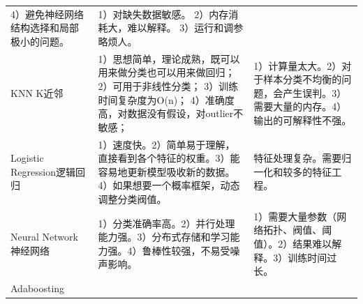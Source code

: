 \begin{longtable}[]{lll}
\begin{minipage}[t]{0.04\columnwidth}
  4）避免神经网络结构选择和局部极小的问题。
  \strut
\end{minipage}
&
\begin{minipage}[t]{0.04\columnwidth}
  \raggedright
  \strut
  1）对缺失数据敏感。
  2）内存消耗大，难以解释。
  3）运行和调参略烦人。
  \strut
\end{minipage}
\tabularnewline
\begin{minipage}[t]{0.04\columnwidth}\raggedright\strut
KNN K近邻\strut
\end{minipage} & \begin{minipage}[t]{0.04\columnwidth}\raggedright\strut
1）思想简单，理论成熟，既可以用来做分类也可以用来做回归；
2）可用于非线性分类； 3）训练时间复杂度为O(n)；
4）准确度高，对数据没有假设，对outlier不敏感；\strut
\end{minipage} & \begin{minipage}[t]{0.04\columnwidth}\raggedright\strut
1）计算量太大。2）对于样本分类不均衡的问题，会产生误判。3）需要大量的内存。4）输出的可解释性不强。\strut
\end{minipage}\tabularnewline
\begin{minipage}[t]{0.04\columnwidth}\raggedright\strut
Logistic Regression逻辑回归\strut
\end{minipage} & \begin{minipage}[t]{0.04\columnwidth}\raggedright\strut
1）速度快。2）简单易于理解，直接看到各个特征的权重。3）能容易地更新模型吸收新的数据。4）如果想要一个概率框架，动态调整分类阀值。\strut
\end{minipage} & \begin{minipage}[t]{0.04\columnwidth}\raggedright\strut
特征处理复杂。需要归一化和较多的特征工程。\strut
\end{minipage}\tabularnewline
\begin{minipage}[t]{0.04\columnwidth}\raggedright\strut
Neural Network 神经网络\strut
\end{minipage} & \begin{minipage}[t]{0.04\columnwidth}\raggedright\strut
1）分类准确率高。2）并行处理能力强。3）分布式存储和学习能力强。4）鲁棒性较强，不易受噪声影响。\strut
\end{minipage} & \begin{minipage}[t]{0.04\columnwidth}\raggedright\strut
1）需要大量参数（网络拓扑、阀值、阈值）。2）结果难以解释。3）训练时间过长。\strut
\end{minipage}\tabularnewline
\begin{minipage}[t]{0.04\columnwidth}\raggedright\strut
Adaboosting\strut

\end{minipage}
\end{longtable}
